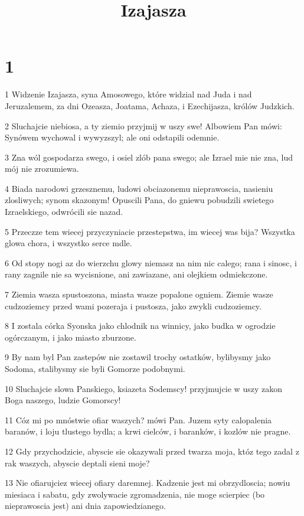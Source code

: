

\title{Izajasza}


\chapter{1}

\par 1 Widzenie Izajasza, syna Amosowego, które widzial nad Juda i nad Jeruzalemem, za dni Ozeasza, Joatama, Achaza, i Ezechijasza, królów Judzkich.
\par 2 Sluchajcie niebiosa, a ty ziemio przyjmij w uszy swe! Albowiem Pan mówi: Synówem wychowal i wywyzszyl; ale oni odstapili odemnie.
\par 3 Zna wól gospodarza swego, i osiel zlób pana swego; ale Izrael mie nie zna, lud mój nie zrozumiewa.
\par 4 Biada narodowi grzesznemu, ludowi obciazonemu nieprawoscia, nasieniu zlosliwych; synom skazonym! Opuscili Pana, do gniewu pobudzili swietego Izraelskiego, odwrócili sie nazad.
\par 5 Przeczze tem wiecej przyczyniacie przestepstwa, im wiecej was bija? Wszystka glowa chora, i wszystko serce mdle.
\par 6 Od stopy nogi az do wierzchu glowy niemasz na nim nic calego; rana i sinosc, i rany zagnile nie sa wycisnione, ani zawiazane, ani olejkiem odmiekczone.
\par 7 Ziemia wasza spustoszona, miasta wasze popalone ogniem. Ziemie wasze cudzoziemcy przed wami pozeraja i pustosza, jako zwykli cudzoziemcy.
\par 8 I zostala córka Syonska jako chlodnik na winnicy, jako budka w ogrodzie ogórczanym, i jako miasto zburzone.
\par 9 By nam byl Pan zastepów nie zostawil trochy ostatków, bylibysmy jako Sodoma, stalibysmy sie byli Gomorze podobnymi.
\par 10 Sluchajcie slowa Panskiego, ksiazeta Sodemscy! przyjmujcie w uszy zakon Boga naszego, ludzie Gomorscy!
\par 11 Cóz mi po mnóstwie ofiar waszych? mówi Pan. Juzem syty calopalenia baranów, i loju tlustego bydla; a krwi cielców, i baranków, i kozlów nie pragne.
\par 12 Gdy przychodzicie, abyscie sie okazywali przed twarza moja, któz tego zadal z rak waszych, abyscie deptali sieni moje?
\par 13 Nie ofiarujciez wiecej ofiary daremnej. Kadzenie jest mi obrzydloscia; nowiu miesiaca i sabatu, gdy zwolywacie zgromadzenia, nie moge scierpiec (bo nieprawoscia jest) ani dnia zapowiedzianego.

